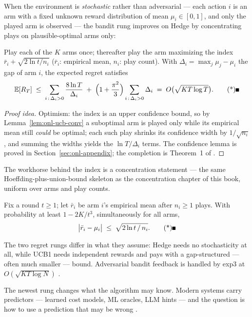 When the environment is \emph{stochastic} rather than adversarial --- each action $i$ is
an arm with a fixed unknown reward distribution of mean $\mu_i \in [0,1]$, and only the
played arm is observed --- the bandit rung improves on Hedge by concentrating plays on
plausible-optimal arms only:

\begin{theorem}\label{thm:onl-ucb}
Play each of the $K$ arms once; thereafter play the arm maximizing the index
$\bar r_i + \sqrt{2\ln t / n_i}$ ($\bar r_i$: empirical mean, $n_i$: play count). With
$\Delta_i = \max_j \mu_j - \mu_i$ the gap of arm $i$, the expected regret satisfies
\[
\mathbb{E}[R_T] \;\le\; \sum_{i\,:\,\Delta_i > 0} \frac{8\ln T}{\Delta_i}
\;+\; \Bigl(1 + \frac{\pi^2}{3}\Bigr)\sum_{i\,:\,\Delta_i > 0}\Delta_i
\;=\; O\bigl(\sqrt{KT\log T}\bigr). \eopm
\]
\end{theorem}

\begin{proof}[Proof idea]
Optimism: the index is an upper confidence bound, so by Lemma~\ref{lem:onl-ucb-conv} a
suboptimal arm is played only while its empirical mean still \emph{could} be optimal;
each such play shrinks its confidence width by $1/\sqrt{n_i}$, and summing the widths
yields the $\ln T/\Delta_i$ terms. The confidence lemma is proved in
Section~\ref{sec:onl-appendix}; the completion is Theorem~1 of
\citep{online-decisions-bg3}.
\end{proof}

The workhorse behind the index is a concentration statement --- the same
Hoeffding-plus-union-bound skeleton as the concentration chapter of this book, uniform
over arms and play counts.

\begin{lemma}\label{lem:onl-ucb-conv}
Fix a round $t \ge 1$; let $\bar r_i$ be arm $i$'s empirical mean after $n_i \ge 1$
plays. With probability at least $1 - 2K/t^{3}$, simultaneously for all arms,
\[
\bigl|\bar r_i - \mu_i\bigr| \;\le\; \sqrt{2\ln t\,/\,n_i}. \eopm
\]
\end{lemma}

The two regret rungs differ in what they assume: Hedge needs no stochasticity at all,
while UCB1 needs independent rewards and pays with a gap-structured --- often much
smaller --- bound. Adversarial bandit feedback is handled by exp3 at
$O(\sqrt{KT\log N})$ \citep{online-decisions-bg8}.

The newest rung changes what the algorithm may know. Modern systems carry predictors ---
learned cost models, ML oracles, LLM hints --- and the question is how to use a
prediction that may be wrong \citep{online-decisions-bg9,online-decisions-bg13}.

